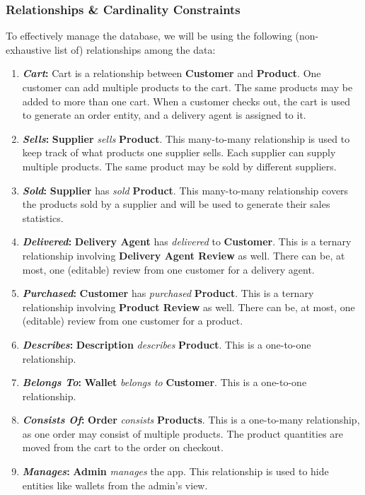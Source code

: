 \subsubsection*{Relationships \& Cardinality Constraints}
To effectively manage the database, we will be using the following (non-exhaustive list of) relationships among the data:
\begin{enumerate}
    \item \textbf{\textit{Cart}:}
    Cart is a relationship between \textbf{Customer} and \textbf{Product}.
    One customer can add multiple products to the cart.
    The same products may be added to more than one cart.
    When a customer checks out, the cart is used to generate an order entity, and a delivery agent is assigned to it.
    \item \textbf{\textit{Sells}:}
    \textbf{Supplier} \textit{sells} \textbf{Product}.
    This many-to-many relationship is used to keep track of what products one supplier sells.
    Each supplier can supply multiple products. The same product may be sold by different suppliers.
    \item \textbf{\textit{Sold}:}
    \textbf{Supplier} has \textit{sold} \textbf{Product}.
    This many-to-many relationship covers the products sold by a supplier and will be used to generate their sales statistics.
    \item \textbf{\textit{Delivered}:}
    \textbf{Delivery Agent} has \textit{delivered} to \textbf{Customer}.
    This is a ternary relationship involving \textbf{Delivery Agent Review} as well.
    There can be, at most, one (editable) review from one customer for a delivery agent.
    \item \textbf{\textit{Purchased}:}
    \textbf{Customer} has \textit{purchased} \textbf{Product}.
    This is a ternary relationship involving \textbf{Product Review} as well.
    There can be, at most, one (editable) review from one customer for a product.
    \item \textbf{\textit{Describes}:}
    \textbf{Description} \textit{describes} \textbf{Product}.
    This is a one-to-one relationship.
    \item \textbf{\textit{Belongs To}:}
    \textbf{Wallet} \textit{belongs to} \textbf{Customer}.
    This is a one-to-one relationship.
    \item \textbf{\textit{Consists Of}:}
    \textbf{Order} \textit{consists} \textbf{Products}.
    This is a one-to-many relationship, as one order may consist of multiple products. The product quantities are moved from the cart to the order on checkout.
    \item \textbf{\textit{Manages}:}
    \textbf{Admin} \textit{manages} the app.
    This relationship is used to hide entities like wallets from the admin's view.
\end{enumerate}
